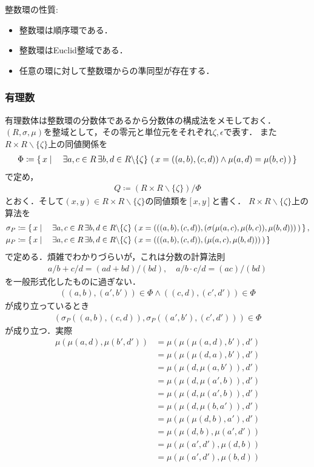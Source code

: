 	整数環の性質:
	\begin{itemize}
		\item 整数環は順序環である．
		\item 整数環はEuclid整域である．
		\item 任意の環に対して整数環からの準同型が存在する．
	\end{itemize}
	
\subsubsection{有理数}
	有理数体は整数環の分数体であるから分数体の構成法をメモしておく．
	$(R,\sigma,\mu)$を整域として，その零元と単位元をそれぞれ$\zeta,\epsilon$で表す．
	また$R \times R \backslash \{\zeta\}$上の同値関係を
	\begin{align}
		\Phi \coloneqq \left\{\, x \mid \quad \exists a,c \in R\, \exists b,d \in R \backslash \{\zeta\}\, \left(\, x=((a,b),(c,d)) \wedge \mu(a,d) = \mu(b,c)\, \right)\, \right\}
	\end{align}
	で定め，
	\begin{align}
		Q \coloneqq (R \times R \backslash \{\zeta\}) / \Phi
	\end{align}
	とおく．そして$(x,y) \in R \times R \backslash \{\zeta\}$の同値類を$[x,y]$と書く．
	$R \times R \backslash \{\zeta\}$上の算法を
	\begin{align}
		\sigma_P &\coloneqq \left\{\, x \mid \quad \exists a,c \in R\, \exists b,d \in R \backslash \{\zeta\}\, \left(\, x=(((a,b),(c,d)),(\sigma(\mu(a,c),\mu(b,c)),\mu(b,d)))\, \right)\, \right\}, \\
		\mu_P &\coloneqq \left\{\, x \mid \quad \exists a,c \in R\, \exists b,d \in R \backslash \{\zeta\}\, \left(\, x=(((a,b),(c,d)),(\mu(a,c),\mu(b,d)))\, \right)\, \right\}
	\end{align}
	で定める．煩雑でわかりづらいが，これは分数の計算法則
	\begin{align}
		a/b + c/d = (ad + bd)/(bd),\quad a/b \cdot c/d = (ac)/(bd)
	\end{align}
	を一般形式化したものに過ぎない．
	\begin{align}
		((a,b),(a',b')) \in \Phi \wedge ((c,d),(c',d')) \in \Phi
	\end{align}
	が成り立っているとき
	\begin{align}
		\left(\sigma_P((a,b),(c,d)),\sigma_P((a',b'),(c',d'))\right) \in \Phi
	\end{align}
	が成り立つ．実際
	\begin{align}
		\mu(\mu(a,d),\mu(b',d')) &= \mu(\mu(\mu(a,d),b'),d') \\
		&= \mu(\mu(\mu(d,a),b'),d') \\
		&= \mu(\mu(d,\mu(a,b')),d') \\
		&= \mu(\mu(d,\mu(a',b)),d') \\
		&= \mu(\mu(d,\mu(a',b)),d') \\
		&= \mu(\mu(d,\mu(b,a')),d') \\
		&= \mu(\mu(\mu(d,b),a'),d') \\
		&= \mu(\mu(d,b),\mu(a',d')) \\
		&= \mu(\mu(a',d'),\mu(d,b)) \\
		&= \mu(\mu(a',d'),\mu(b,d)) \\
	\end{align}
